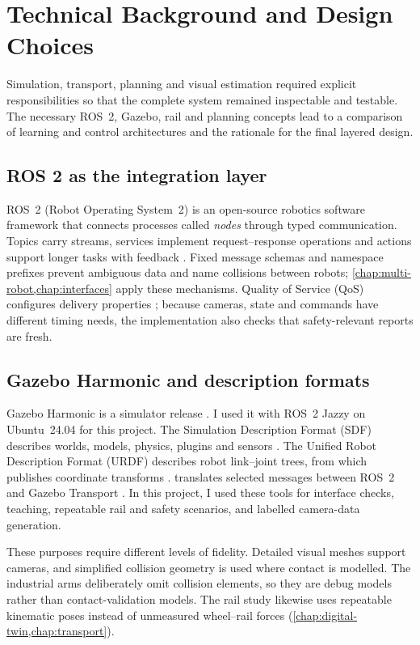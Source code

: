 \chapter{Technical Background and Design Choices}
\label{chap:background}

Simulation, transport, planning and visual estimation required explicit
responsibilities so that the complete system remained inspectable and testable.
The necessary ROS~2, Gazebo, rail and planning concepts lead to a comparison of
learning and control architectures and the rationale for the final layered
design.

\section{ROS 2 as the integration layer}

ROS~2 (Robot Operating System~2) is an open-source robotics software framework
that connects processes called \emph{nodes} through typed communication.
Topics carry streams, services implement request--response operations and
actions support longer tasks with feedback \citep{ros2jazzyinterfaces}. Fixed
message schemas and namespace prefixes prevent ambiguous data and name
collisions between robots; \cref{chap:multi-robot,chap:interfaces} apply these
mechanisms. Quality of Service (QoS) configures delivery properties
\citep{ros2qos}; because cameras, state and commands have different timing
needs, the implementation also checks that safety-relevant reports are fresh.

\section{Gazebo Harmonic and description formats}

Gazebo Harmonic is a simulator release \citep{gazeboharmonic}. I used it with
ROS~2 Jazzy on Ubuntu~24.04 for this project. The Simulation Description Format
(SDF) describes worlds, models, physics, plugins and sensors \citep{sdfspec}.
The Unified Robot Description Format (URDF) describes robot link--joint trees,
from which  publishes coordinate transforms
\citep{robotstatepublisher}.  translates selected
messages between ROS~2 and Gazebo Transport \citep{gazeborosintegration}.
In this project, I used these tools for interface checks, teaching, repeatable
rail and safety scenarios, and labelled camera-data generation.

These purposes require different levels of fidelity. Detailed visual meshes
support cameras, and simplified collision geometry is used where contact is
modelled. The industrial arms deliberately omit collision elements, so they are
debug models rather than contact-validation models. The rail study likewise
uses repeatable kinematic poses instead of unmeasured wheel--rail forces
(\cref{chap:digital-twin,chap:transport}).

